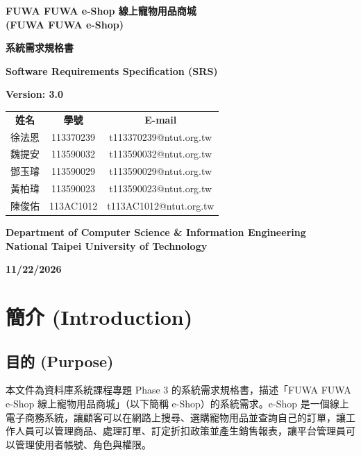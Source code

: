 \documentclass[12pt,a4paper]{article}
\newcommand{\projectname}{FUWA FUWA e-Shop 線上寵物用品商城}
\newcommand{\projectnameEN}{FUWA FUWA e-Shop}
\newcommand{\docdate}{11/22/2026}
\begin{document}
\begin{titlepage}
\centering
\vspace*{1.5cm}
{\Large\bfseries \projectname\\[0.3em] (\projectnameEN)\par}
\vspace{1.5cm}
{\LARGE\bfseries 系統需求規格書\par}
\vspace{0.5cm}
{\Large\bfseries Software Requirements Specification (SRS)\par}
\vspace{0.5cm}
{\large\bfseries Version: 3.0\par}
\vspace{1.2cm}
\renewcommand{\arraystretch}{1.4}
\begin{tabular}{ccc}
\textbf{姓名} & \textbf{學號} & \textbf{E-mail}\\
徐法恩 & 113370239 & t113370239@ntut.org.tw\\
魏提安 & 113590032 & t113590032@ntut.org.tw\\
鄧玉璿 & 113590029 & t113590029@ntut.org.tw\\
黃柏瑋 & 113590023 & t113590023@ntut.org.tw\\
陳俊佑 & 113AC1012 & t113AC1012@ntut.org.tw\\
\end{tabular}
\vfill
{\large\bfseries Department of Computer Science \& Information Engineering\\
National Taipei University of Technology\par}
\vspace{1cm}
{\large\bfseries \docdate\par}
\vspace*{1cm}
\end{titlepage}

\setcounter{page}{1}
\tableofcontents
\clearpage
{}
\setcounter{page}{1}

\section{簡介 (Introduction)}

\subsection{目的 (Purpose)}
本文件為資料庫系統課程專題 Phase 3 的系統需求規格書，描述「\projectname」（以下簡稱 e-Shop）的系統需求。e-Shop 是一個線上電子商務系統，讓顧客可以在網路上搜尋、選購寵物用品並查詢自己的訂單，讓工作人員可以管理商品、處理訂單、訂定折扣政策並產生銷售報表，讓平台管理員可以管理使用者帳號、角色與權限。
\end{document}
